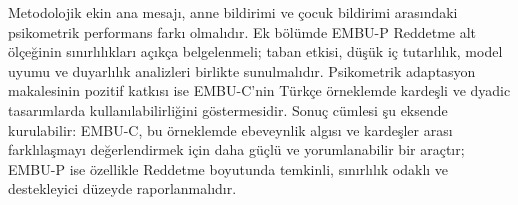 \documentclass[
  turkish,
  12pt,
  a4paper,
]{report}
\begin{document}
Metodolojik ekin ana mesajı, anne bildirimi ve çocuk bildirimi
arasındaki psikometrik performans farkı olmalıdır. Ek bölümde EMBU-P
Reddetme alt ölçeğinin sınırlılıkları açıkça belgelenmeli; taban etkisi,
düşük iç tutarlılık, model uyumu ve duyarlılık analizleri birlikte
sunulmalıdır. Psikometrik adaptasyon makalesinin pozitif katkısı ise
EMBU-C'nin Türkçe örneklemde kardeşli ve dyadic tasarımlarda
kullanılabilirliğini göstermesidir. Sonuç cümlesi şu eksende
kurulabilir: EMBU-C, bu örneklemde ebeveynlik algısı ve kardeşler arası
farklılaşmayı değerlendirmek için daha güçlü ve yorumlanabilir bir
araçtır; EMBU-P ise özellikle Reddetme boyutunda temkinli, sınırlılık
odaklı ve destekleyici düzeyde raporlanmalıdır.
\end{document}
